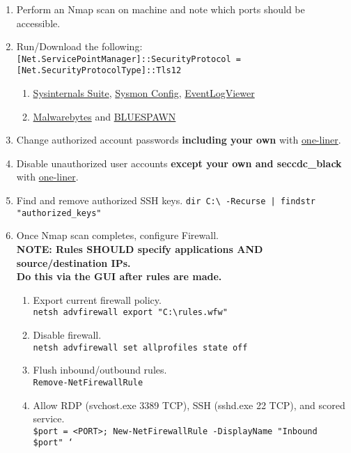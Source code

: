 \documentclass[12pt,letterpaper]{article}
\def\code#1{\textcolor{iris}{\texttt{#1}}}
\def\bf#1{\textbf{#1}}
\begin{document}
\begin{enumerate}
	\item Perform an Nmap scan on machine and note which ports should be accessible.
	\item Run/Download the following: \\
		\code{[Net.ServicePointManager]::SecurityProtocol = [Net.SecurityProtocolType]::Tls12}
		\begin{enumerate}
			\item \href{https://download.sysinternals.com/files/SysinternalsSuite.zip}{Sysinternals Suite}, \href{https://raw.githubusercontent.com/D42H5/cyber\_comp\_resources/main/sysmonconfig-export-modified-2-2-24.xml}{Sysmon Config}, \href{https://www.nirsoft.net/utils/fulleventlogview-x64.zip}{EventLogViewer}
			\item \href{https://downloads.malwarebytes.com/file/mb-windows}{Malwarebytes} and \href{https://github.com/ION28/BLUESPAWN/releases/download/v0.5.1-alpha/BLUESPAWN-client-x64.exe}{BLUESPAWN}
		\end{enumerate}
	\item Change authorized account passwords \bf{including your own} with \hyperref[subsec:woliner]{one-liner}.
	\item Disable unauthorized user accounts \bf{except your own and seccdc\_black} with \hyperref[subsec:woliner]{one-liner}.
	\item Find and remove authorized SSH keys.
		\code{dir C:\textbackslash{} -Recurse | findstr "authorized\_keys"}
	\item Once Nmap scan completes, configure Firewall. \\
	\bf{NOTE: Rules SHOULD specify applications AND source/destination IPs. \\Do this via the GUI after rules are made.}	
		\begin{enumerate}
			\item Export current firewall policy. \\
				\code{netsh advfirewall export "C:\textbackslash{}rules.wfw"}
			\item Disable firewall. \\
				\code{netsh advfirewall set allprofiles state off}
			\item Flush inbound/outbound rules. \\
				\code{Remove-NetFirewallRule}
			\item Allow RDP (svchost.exe 3389 TCP), SSH (sshd.exe 22 TCP), and scored service. \\
				\code{\$port = <PORT>; New-NetFirewallRule -DisplayName "Inbound \$port" ` \\
}
\end{enumerate}
\end{enumerate}
\end{document}
